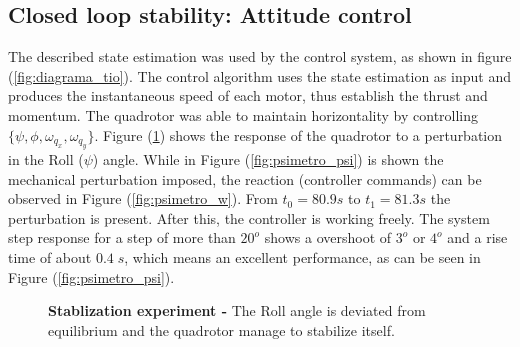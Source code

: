 \documentclass[conference]{IEEEtran}
\newcommand{\refp}[1]{(\ref{#1})}
\begin{document}
\subsection{Closed loop stability: Attitude control}
The described state estimation was used by the control system, as shown in figure \refp{fig:diagrama_tio}. The control algorithm uses the state estimation as input and produces the instantaneous speed of each motor, thus establish the thrust and momentum.
The quadrotor was able to maintain horizontality by controlling $\{\psi,\phi,\omega_{q_x},\omega_{q_y}\}$. 
Figure \refp{fig:psimetro} shows the response of the quadrotor to a perturbation in the Roll ($\psi$) angle. While in Figure \refp{fig:psimetro_psi} is shown the mechanical perturbation imposed, the reaction (controller commands) can be observed in Figure \refp{fig:psimetro_w}. From $t_0 = 80.9 s$ to $t_1 =81.3 s$ the perturbation is present. After this, the controller is working freely. The system step response for a step of more than $20^o$ shows a overshoot of $3^o$ or $4^o$ and a rise time of about $0.4\;s$, which means an excellent performance, as can be seen in Figure \refp{fig:psimetro_psi}.
\begin{figure}[h!]
  \centering
   \hspace*{-5pt}
  \caption{\textbf{Stablization experiment -} The Roll angle is deviated from equilibrium and the quadrotor manage to stabilize itself.}
  \label{fig:psimetro}
\end{figure}
\end{document}
